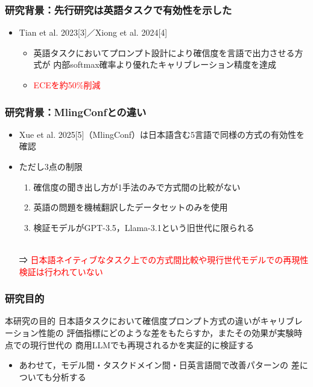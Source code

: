 \documentclass[dvipdfmx]{beamer}
\begin{document}
\begin{frame}
\frametitle{研究背景：先行研究は英語タスクで有効性を示した}
\begin{itemize}
	\item Tian et al. 2023[3]／Xiong et al. 2024[4]
	\begin{itemize}
		\item 英語タスクにおいてプロンプト設計により確信度を言語で出力させる方式が
		      内部softmax確率より優れたキャリブレーション精度を達成
		\item \textcolor{red}{ECEを約50\%削減}
	\end{itemize}
\end{itemize}
\end{frame}

\begin{frame}
\frametitle{研究背景：MlingConfとの違い}
\begin{itemize}
	\item Xue et al. 2025[5]（MlingConf）は日本語含む5言語で同様の方式の有効性を確認
	\vspace{5pt}
	\item ただし3点の制限
	\begin{enumerate}
		\item 確信度の聞き出し方が1手法のみで方式間の比較がない
		\item 英語の問題を機械翻訳したデータセットのみを使用
		\item 検証モデルがGPT-3.5，Llama-3.1という旧世代に限られる
	\end{enumerate}
	\vspace{5pt}
	\\⇒ \textcolor{red}{日本語ネイティブなタスク上での方式間比較や現行世代モデルでの再現性検証は行われていない}
\end{itemize}
\end{frame}

\begin{frame}
\frametitle{研究目的}
\begin{block}{本研究の目的}
日本語タスクにおいて確信度プロンプト方式の違いがキャリブレーション性能の
評価指標にどのような差をもたらすか，またその効果が実験時点での現行世代の
商用LLMでも再現されるかを実証的に検証する
\end{block}
\vspace{10pt}
\begin{itemize}
	\item あわせて，モデル間・タスクドメイン間・日英言語間で改善パターンの
	      差についても分析する
\end{itemize}
\end{frame}
\end{document}
